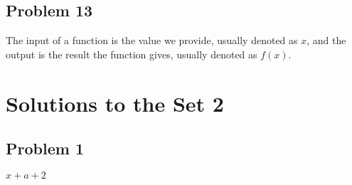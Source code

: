 \documentclass[12pt]{article}
\begin{document}
\subsection*{Problem 13}
The input of a function is the value we provide, usually denoted as \(x\), and the output is the result the function gives, usually denoted as \(f(x)\). 

\section*{Solutions to the Set 2}
\subsection*{Problem 1}
\(x+a+2\)
\end{document}
